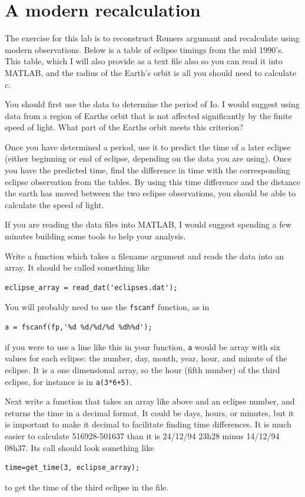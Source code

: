 \documentclass{tufte-handout}
\begin{document}
\section{A modern recalculation}

The exercise for this lab is to reconstruct R{\o}mers argumant and recalculate using modern observations.  Below is a table of eclipse timings from the mid 1990's.  This table, which I will also provide as a text file also so you can read it into {\sc MATLAB}, and the radius of the Earth's orbit is all you should need to calculate $c$.

You should first use the data to determine the period of Io.  I would suggest using data from a region of Earths orbit that is not affected significantly by the finite speed of light.  What part of the Earths orbit meets this criterion?

Once you have determined a period, use it to predict the time of a later eclipse (either beginning or end of eclipse, depending on the data you are using).  Once you have the predicted time, find the difference in time with the corresponding eclipse observation from the tables.  By using this time difference and the distance the earth has moved between the two eclipse observations, you should be able to calculate the speed of light.

If you are reading the data files into {\sc MATLAB}, I would suggest spending a few minutes building some tools to help your analysis. 

Write a function which takes a filename argument and reads the data into an array.   It should be called something like
\begin{verbatim}
eclipse_array = read_dat('eclipses.dat');
\end{verbatim}
You will probably need to use the {\tt fscanf} function, as in
\begin{verbatim}
a = fscanf(fp,'%d %d/%d/%d %dh%d');
\end{verbatim}
if you were to use a line like this in your function, {\tt a} would be array with six values for each eclipse: the number, day, month, year, hour, and minute of the eclipse.  It is a one dimensional array, so the hour (fifth number) of the third eclipse, for instance is in {\tt a(3*6+5)}.

Next write a function that takes an array like above and an eclipse number, and returns the time in a decimal format.  It could be days, hours, or minutes, but it is important to make it decimal to facilitate finding time differences.  It is much easier to calculate  516928-501637  than it is 24/12/94 23h28 minus 14/12/94 08h37.  Its call should look something like
\begin{verbatim}
time=get_time(3, eclipse_array);
\end{verbatim}
to get the time of the third eclipse in the file.
\end{document}
